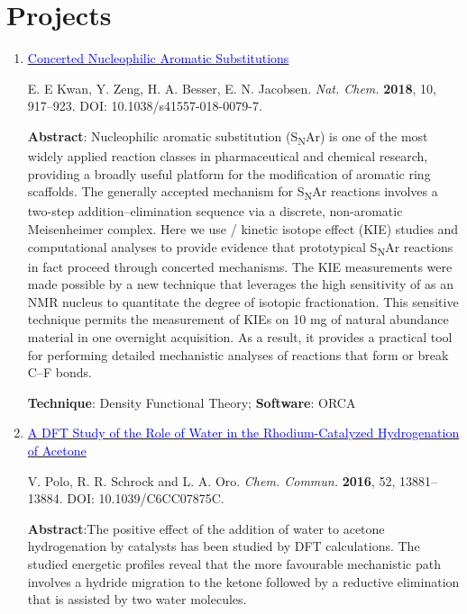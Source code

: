 \documentclass[10pt]{article}
\begin{document}
\section{Projects}


\begin{enumerate}
    \item \href{https://doi.org/10.1038/s41557-018-0079-7}{\textcolor{blue}{Concerted Nucleophilic Aromatic Substitutions}}

          E. E Kwan, Y. Zeng, H. A. Besser, E. N. Jacobsen. {\it Nat. Chem.} {\bf 2018}, 10, 917--923. DOI: 10.1038/s41557-018-0079-7.
 
          \textbf{Abstract}: Nucleophilic aromatic substitution (S\textsubscript{N}Ar) is one of the most widely applied reaction classes in pharmaceutical and chemical research, providing a broadly useful platform for the modification of aromatic ring scaffolds. The generally accepted mechanism for S\textsubscript{N}Ar reactions involves a two-step addition–elimination sequence via a discrete, non-aromatic Meisenheimer complex. Here we use / kinetic isotope effect (KIE) studies and computational analyses to provide evidence that prototypical S\textsubscript{N}Ar reactions in fact proceed through concerted mechanisms. The KIE measurements were made possible by a new technique that leverages the high sensitivity of  as an NMR nucleus to quantitate the degree of isotopic fractionation. This sensitive technique permits the measurement of KIEs on 10 mg of natural abundance material in one overnight acquisition. As a result, it provides a practical tool for performing detailed mechanistic analyses of reactions that form or break C--F bonds.

          \textbf{Technique}: Density Functional Theory; \textbf{Software}: {ORCA}

          \vspace{0.5cm}

    \item \href{https://doi.org/10.1039/C6CC07875C}{\textcolor{blue}{A DFT Study of the Role of Water in the Rhodium-Catalyzed Hydrogenation of Acetone}}

          V. Polo, R. R. Schrock and L. A. Oro. {\it Chem. Commun.} {\bf 2016}, 52, 13881--13884. DOI: 10.1039/C6CC07875C.
 
          \textbf{Abstract}:The positive effect of the addition of water to acetone hydrogenation by \ce{[RhH2(PR3)2S2]+} catalysts has been studied by DFT calculations. The studied energetic profiles reveal that the more favourable mechanistic path involves a hydride migration to the ketone followed by a reductive elimination that is assisted by two water molecules.


\end{enumerate}
\end{document}
